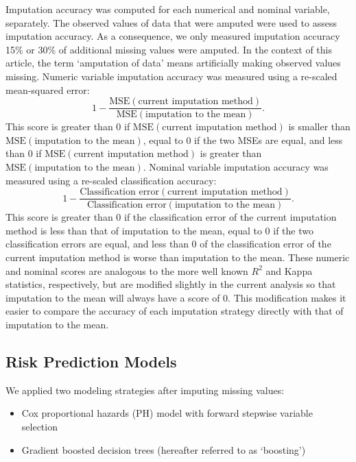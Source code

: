 \documentclass{article}
\begin{document}
Imputation accuracy was computed for each numerical and nominal
variable, separately. The observed values of data that were amputed were
used to assess imputation accuracy. As a consequence, we only measured
imputation accuracy 15\% or 30\% of additional missing values were
amputed. In the context of this article, the term `amputation of data'
means artificially making observed values missing. Numeric variable
imputation accuracy was measured using a re-scaled mean-squared error:
\[1 - \frac{\textrm{MSE}(\textrm{current imputation method})}{\textrm{MSE}(\textrm{imputation to the mean})}.\]
This score is greater than 0 if
\(\textrm{MSE}(\textrm{current imputation method})\) is smaller than
\(\textrm{MSE}(\textrm{imputation to the mean})\), equal to 0 if the two
MSEs are equal, and less than 0 if
\(\textrm{MSE}(\textrm{current imputation method})\) is greater than
\(\textrm{MSE}(\textrm{imputation to the mean})\). Nominal variable
imputation accuracy was measured using a re-scaled classification
accuracy:
\[1 - \frac{\textrm{Classification error}(\textrm{current imputation method})}{\textrm{Classification error}(\textrm{imputation to the mean})}.\]
This score is greater than 0 if the classification error of the current
imputation method is less than that of imputation to the mean, equal to
0 if the two classification errors are equal, and less than 0 of the
classification error of the current imputation method is worse than
imputation to the mean. These numeric and nominal scores are analogous
to the more well known \(R^2\) and Kappa statistics, respectively, but
are modified slightly in the current analysis so that imputation to the
mean will always have a score of 0. This modification makes it easier to
compare the accuracy of each imputation strategy directly with that of
imputation to the mean.

\hypertarget{risk-prediction-models}{%
\subsection{Risk Prediction Models}\label{risk-prediction-models}}

\label{subsec:modeling}

We applied two modeling strategies after imputing missing values:

\begin{itemize}
\tightlist
\item
  Cox proportional hazards (PH) model with forward stepwise variable
  selection
\item
  Gradient boosted decision trees (hereafter referred to as `boosting')
\end{itemize}
\end{document}
